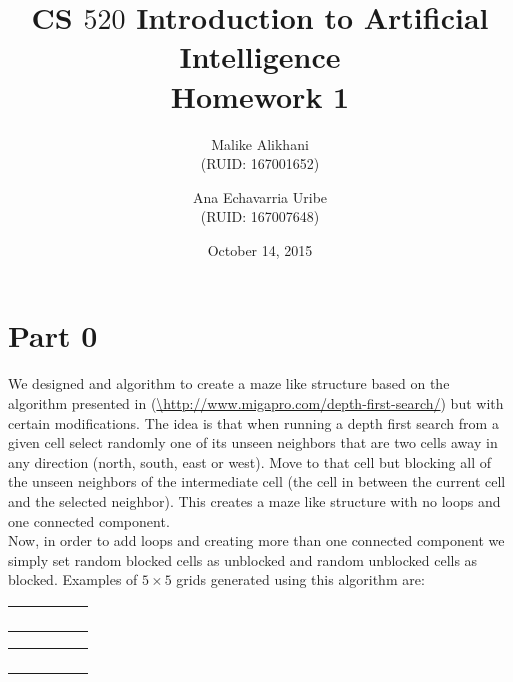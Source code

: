 \documentclass{article}
\begin{document}
\title{CS $520$ Introduction to Artificial Intelligence \\ Homework 1 }
\date{October 14, 2015}
\author{Malike Alikhani \\ \small{(RUID: 167001652)} \and Ana Echavarria Uribe \\ \small{(RUID: 167007648)}}

\maketitle

\section*{Part 0}

We designed and algorithm to create a maze like structure based on the algorithm presented in (\url{\http://www.migapro.com/depth-first-search/}) but with certain modifications. The idea is that when running a depth first search from a given cell select randomly one of its unseen neighbors that are two cells away in any direction (north, south, east or west). Move to that cell but blocking all of the unseen neighbors of the intermediate cell (the cell in between the current cell and the selected neighbor). This creates a maze like structure with no loops and one connected component.\\
Now, in order to add loops and creating more than one connected component we simply set random blocked cells as unblocked and random unblocked cells as blocked.
Examples of $5 \times 5$ grids generated using this algorithm are:

\newcommand{\bl}{\cellcolor{black!100}}
\begin{multicols}{2}
  \begin{center}
    \begin{tabular}{|*{5}{c|}}
      \hline
      \bl & & \bl & & \bl \\ \hline
      \bl & & \bl & & \bl \\ \hline
      & & & \bl & \bl \\ \hline
      \bl &  & \bl & \bl & \\ \hline
      \bl & & & & \bl \\ \hline
    \end{tabular}
    
    \begin{tabular}{|*{5}{c|}}
      \hline
      & \bl & \bl & & \bl \\ \hline
      & & & \bl & \bl \\ \hline
      & \bl & & &  \\ \hline
      &  &  & \bl & \\ \hline
      & \bl & \bl & \bl & \bl \\ \hline
    \end{tabular}
  \end{center}
\end{multicols}
\end{document}
